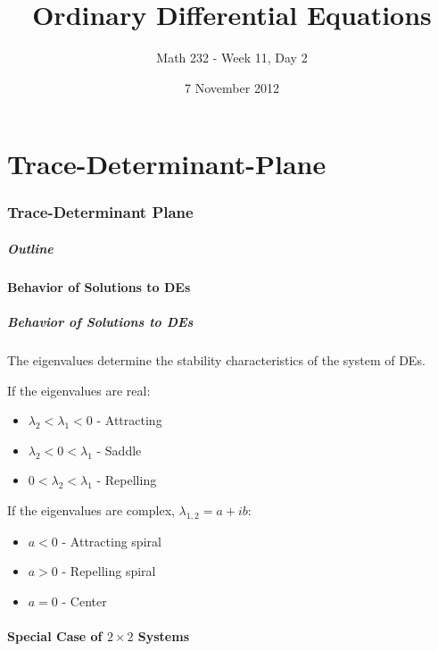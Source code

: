 \part{Trace-Determinant-Plane}
\section{Trace-Determinant Plane}


\title{Ordinary Differential Equations}
\subtitle{Math 232 - Week 11, Day 2}
\date{7 November 2012}

\begin{frame}
  \titlepage
\end{frame}

\begin{frame}
  \frametitle{Outline}
\end{frame}


\subsection{Behavior of Solutions to DEs}


\begin{frame}
  \frametitle{Behavior of Solutions to DEs}

  The eigenvalues determine the stability characteristics of the
  system of DEs.

  If the eigenvalues are real:
  \begin{itemize}
  \item $\lambda_2 < \lambda_1 < 0$ - Attracting
  \item $\lambda_2 < 0 < \lambda_1$ - Saddle
  \item $0 < \lambda_2 < \lambda_1$ - Repelling
  \end{itemize}

  If the eigenvalues are complex, $\lambda_{1,2}=a+ib$:
  \begin{itemize}
  \item $a<0$ - Attracting spiral
  \item $a>0$ - Repelling spiral
  \item $a=0$ - Center
  \end{itemize}

\end{frame}

\subsection{Special Case of $2\times 2$ Systems}

